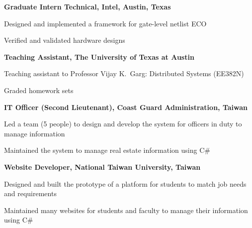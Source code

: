 \begin{myexp}
\item \textbf{Graduate Intern Technical, Intel, Austin, Texas}   
    \begin{mybullet}
        \item Designed and implemented a framework for gate-level netlist ECO
        \item Verified and validated hardware designs
    \end{mybullet}
\item \textbf{Teaching Assistant, The University of Texas at 
    Austin}  
    \begin{mybullet}
        \item Teaching assistant to Professor Vijay K.~Garg: Distributed Systems
            (EE382N) 
        \item Graded homework sets
    \end{mybullet}
\item \textbf{IT Officer (Second Lieutenant), Coast Guard Administration, 
    Taiwan }   
    \begin{mybullet}
        \item Led a team (5 people) to design and develop the system for 
            officers in duty to manage information
        \item Maintained the system to manage real estate information using C\#
    \end{mybullet}
\item \textbf{Website Developer, National Taiwan University, Taiwan} 
    \begin{mybullet}
        \item Designed and built the prototype of a platform for students to 
            match job needs and requirements
        \item Maintained many websites for students and faculty to manage 
            their information using C\#
    \end{mybullet}
\end{myexp}

